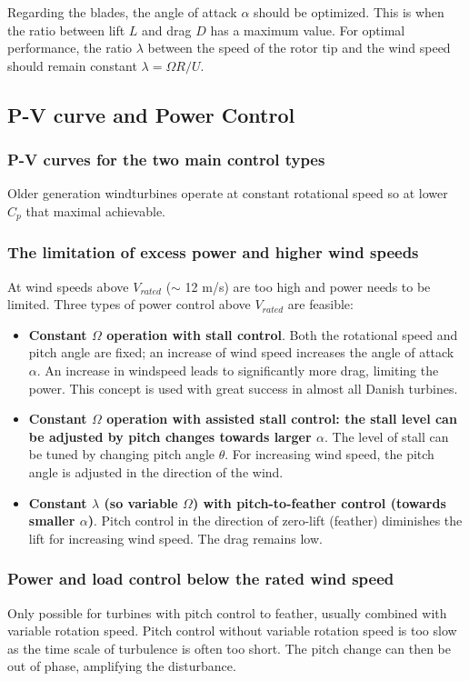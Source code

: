 \documentclass[a4paper,10pt]{article}
\begin{document}
Regarding the blades, the angle of attack $\alpha$ should be optimized. This is when the ratio between lift $L$ and drag $D$ has a maximum value. For optimal performance, the ratio $\lambda$ between the speed of the rotor tip and the wind speed should remain constant $\lambda = \Omega R/U$.


\subsection{P-V curve and Power Control}
\subsubsection{P-V curves for the two main control types}
Older generation windturbines operate at constant rotational speed so at lower $C_p$ that maximal achievable. 

\subsubsection{The limitation of excess power and higher wind speeds}
At wind speeds above $V_{rated}$ ($\sim$ 12 m/s) are too high and power needs to be limited. Three types of power control above $V_{rated}$ are feasible:
\begin{itemize}
 \item \textbf{Constant $\Omega$ operation with stall control}. Both the rotational speed and pitch angle are fixed; an increase of wind speed increases the angle of attack $\alpha$. An increase in windspeed leads to significantly more drag, limiting the power. This concept is used with great success in almost all Danish turbines. 
 \item \textbf{Constant $\Omega$ operation with assisted stall control: the stall level can be adjusted by pitch changes towards larger $\alpha$}. The level of stall can be tuned by changing pitch angle $\theta$. For increasing wind speed, the pitch angle is adjusted in the direction of the wind. 
 \item \textbf{Constant $\lambda$ (so variable $\Omega$) with pitch-to-feather control (towards smaller $\alpha$)}. Pitch control in the direction of zero-lift (feather) diminishes the lift for increasing wind speed. The drag remains low.
\end{itemize}

\subsubsection{Power and load control below the rated wind speed}
Only possible for turbines with pitch control to feather, usually combined with variable rotation speed. Pitch control without variable rotation speed is too slow as the time scale of turbulence is often too short. The pitch change can then be out of phase, amplifying the disturbance. 
\end{document}
